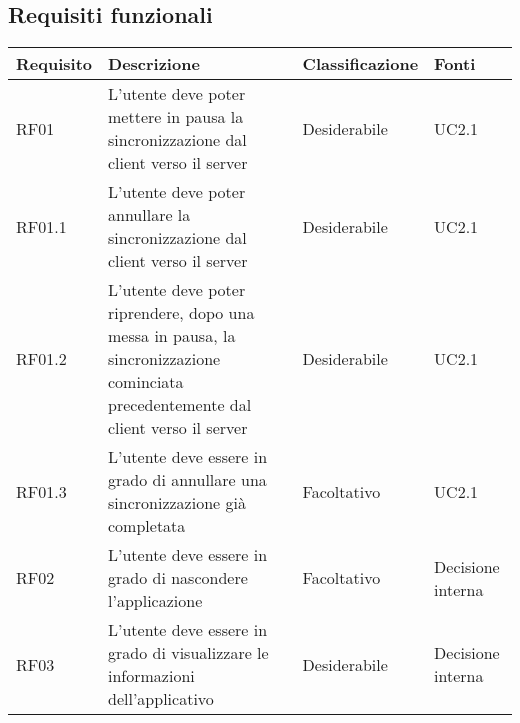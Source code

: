 \subsection{Requisiti funzionali}
{
    \setlength{\freewidth}{\dimexpr\textwidth-8\tabcolsep}
    \renewcommand{\arraystretch}{1.5}
    \centering
    \setlength{\aboverulesep}{0pt}
    \setlength{\belowrulesep}{0pt}
    \begin{longtable}{C{.20\freewidth} C{.40\freewidth} C{.20\freewidth} C{.20\freewidth}}
        \toprule 
        \textbf{Requisito} & \textbf{Descrizione} & \textbf{Classificazione} & \textbf{Fonti} \\
        \toprule
        \endhead

        RF01    & L'utente deve poter mettere in pausa la sincronizzazione dal client verso il server & Desiderabile & UC2.1 \\
        RF01.1  & L'utente deve poter annullare la sincronizzazione dal client verso il server & Desiderabile & UC2.1 \\
        RF01.2  & L'utente deve poter riprendere, dopo una messa in pausa, la sincronizzazione cominciata precedentemente dal client verso il server & Desiderabile & UC2.1 \\
        RF01.3  & L'utente deve essere in grado di annullare una sincronizzazione già completata & Facoltativo & UC2.1 \\
        RF02    & L'utente deve essere in grado di nascondere l'applicazione & Facoltativo & Decisione interna \\
        RF03    & L'utente deve essere in grado di visualizzare le informazioni dell'applicativo & Desiderabile & Decisione interna \\


\end{longtable}}
